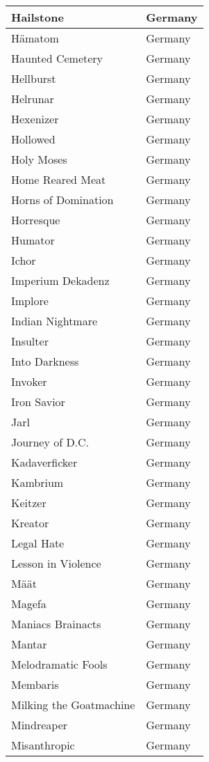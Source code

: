 \documentclass[12pt, a4paper, twoside]{report}
\begin{document}
\begin{center}
\begin{longtable}{|p{5cm}|p{5cm}|}
Hailstone & Germany \\ \hline
Hämatom & Germany \\ \hline
Haunted Cemetery & Germany \\ \hline
Hellburst & Germany \\ \hline
Helrunar & Germany \\ \hline
Hexenizer & Germany \\ \hline
Hollowed & Germany \\ \hline
Holy Moses & Germany \\ \hline
Home Reared Meat & Germany \\ \hline
Horns of Domination & Germany \\ \hline
Horresque & Germany \\ \hline
Humator & Germany \\ \hline
Ichor & Germany \\ \hline
Imperium Dekadenz & Germany \\ \hline
Implore & Germany \\ \hline
Indian Nightmare & Germany \\ \hline
Insulter & Germany \\ \hline
Into Darkness & Germany \\ \hline
Invoker & Germany \\ \hline
Iron Savior & Germany \\ \hline
Jarl & Germany \\ \hline
Journey of D.C. & Germany \\ \hline
Kadaverficker & Germany \\ \hline
Kambrium & Germany \\ \hline
Keitzer & Germany \\ \hline
Kreator & Germany \\ \hline
Legal Hate & Germany \\ \hline
Lesson in Violence & Germany \\ \hline
Määt & Germany \\ \hline
Magefa & Germany \\ \hline
Maniacs Brainacts & Germany \\ \hline
Mantar & Germany \\ \hline
Melodramatic Fools & Germany \\ \hline
Membaris & Germany \\ \hline
Milking the Goatmachine & Germany \\ \hline
Mindreaper & Germany \\ \hline
Misanthropic & Germany \\ \hline

\end{longtable}
\end{center}
\end{document}
